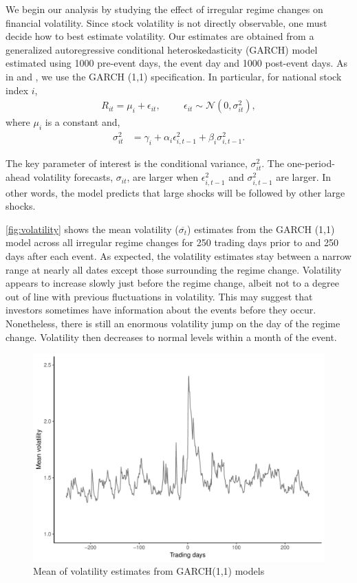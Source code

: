 \documentclass[12pt,final,fleqn]{article}
\theoremstyle{plain}
\begin{document}
We begin our analysis by studying the effect of irregular regime changes on financial volatility. Since stock volatility is not directly observable, one must decide how to best estimate volatility. Our estimates are obtained from a generalized autoregressive conditional heteroskedasticity (GARCH) model estimated using 1000 pre-event days, the event day and 1000 post-event days. As in \citet{jensen2005market} and \citet{leblang2005government}, we use the GARCH (1,1) specification. In particular, for national stock index $i$,
\begin{align*}
R_{it}=\mu_i + \epsilon_{it},\hspace{1cm} \epsilon_{it}\sim \mathcal{N}\left(0,\sigma_{it}^2\right),
\end{align*}
where $\mu_i$ is a constant and,
\begin{align*}
\sigma_{it}^2&=\gamma_{i}+\alpha_{i}\epsilon_{i,t-1}^2+\beta_{i}\sigma_{i,t-1}^2.
\end{align*}

The key parameter of interest is the conditional variance, $\sigma_{it}^2$. The one-period-ahead volatility forecasts, $\sigma_{it}$, are larger when $\epsilon_{i,t-1}^2$ and $\sigma_{i,t-1}^2$ are larger. In other words, the model predicts that large shocks will be followed by other large shocks.

\autoref{fig:volatility} shows the mean volatility ($\overline{\sigma_t}$) estimates from the GARCH (1,1) model across all irregular regime changes for 250 trading days prior to and 250 days after each event. As expected, the volatility estimates stay between a narrow range at nearly all dates except those surrounding the regime change. Volatility appears to increase slowly just before the regime change, albeit not to a degree out of line with previous fluctuations in volatility. This may suggest that investors sometimes have information about the events before they occur. Nonetheless, there is still an enormous volatility jump on the day of the regime change. Volatility then decreases to normal levels within a month of the event.

\begin{figure}[!htb]
\includegraphics[scale = 0.9]{../figs/mean-volatility.pdf}
\caption{Mean of volatility estimates from GARCH(1,1) models}
\label{fig:volatility}
\end{figure}
\end{document}
